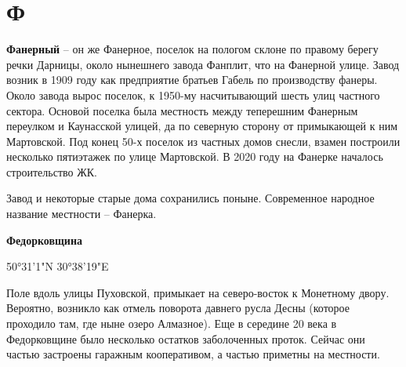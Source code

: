 \chapter*{Ф}

\textbf{Фанерный} – он же Фанерное, поселок на пологом склоне по правому берегу речки Дарницы, около нынешнего завода Фанплит, что на Фанерной улице. Завод возник в 1909 году как предприятие братьев Габель по производству фанеры. Около завода вырос поселок, к 1950-му насчитывающий шесть улиц частного сектора. Основой поселка была местность между теперешним Фанерным переулком и Каунасской улицей, да по северную сторону от примыкающей к ним Мартовской. Под конец 50-х поселок из частных домов снесли, взамен построили несколько пятиэтажек по улице Мартовской. В 2020 году на Фанерке началось строительство ЖК.

Завод и некоторые старые дома сохранились поныне. Современное народное название местности – Фанерка.\\

\medskip

\textbf{Федорковщина}

50°31'1"N 30°38'19"E 

Поле вдоль улицы Пуховской, примыкает на северо-восток к Монетному двору. Вероятно, возникло как отмель поворота давнего русла Десны (которое проходило там, где ныне озеро Алмазное). Еще в середине 20 века в Федорковщине было несколько остатков заболоченных проток. Сейчас они частью застроены гаражным кооперативом, а частью приметны на местности.
